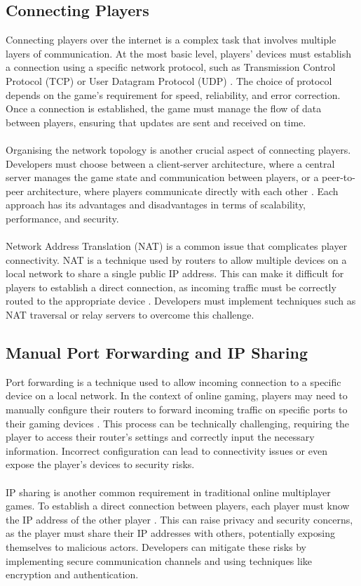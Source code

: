 \subsection{Connecting Players}
Connecting players over the internet is a complex task that involves multiple layers of communication. At the most basic level, players' devices must establish a connection using a specific network protocol, such as Transmission Control Protocol (TCP) or User Datagram Protocol (UDP) \cite{network-architecting}. The choice of protocol depends on the game's requirement for speed, reliability, and error correction. Once a connection is established, the game must manage the flow of data between players, ensuring that updates are sent and received on time.
\\
\noindent
\\
Organising the network topology is another crucial aspect of connecting players. Developers must choose between a client-server architecture, where a central server manages the game state and communication between players, or a peer-to-peer architecture, where players communicate directly with each other \cite{develop-unity}. Each approach has its advantages and disadvantages in terms of scalability, performance, and security.
\\
\noindent
\\
Network Address Translation (NAT) is a common issue that complicates player connectivity. NAT is a technique used by routers to allow multiple devices on a local network to share a single public IP address. This can make it difficult for players to establish a direct connection, as incoming traffic must be correctly routed to the appropriate device \cite{port-forwarding}. Developers must implement techniques such as NAT traversal or relay servers to overcome this challenge.

\subsection{Manual Port Forwarding and IP Sharing}
Port forwarding is a technique used to allow incoming connection to a specific device on a local network. In the context of online gaming, players may need to manually configure their routers to forward incoming traffic on specific ports to their gaming devices \cite{network-architecting}. This process can be technically challenging, requiring the player to access their router's settings and correctly input the necessary information. Incorrect configuration can lead to connectivity issues or even expose the player's devices to security risks.
\\
\noindent
\\
IP sharing is another common requirement in traditional online multiplayer games. To establish a direct connection between players, each player must know the IP address of the other player \cite{multiplayer-networking}. This can raise privacy and security concerns, as the player must share their IP addresses with others, potentially exposing themselves to malicious actors. Developers can mitigate these risks by implementing secure communication channels and using techniques like encryption and authentication.

